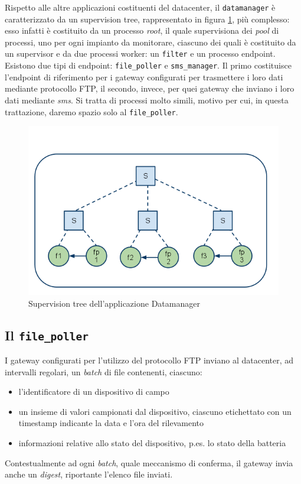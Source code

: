 %
Rispetto alle altre applicazioni costituenti del datacenter, il \texttt{datamanager} \`e 
caratterizzato da un supervision tree, rappresentato in figura \ref{datamanagersuptree},
pi\`u complesso: esso infatti \`e costituito da un processo \emph{root}, il quale supervisiona
dei \emph{pool} di processi, uno per ogni impianto da monitorare, ciascuno dei quali \`e costituito da un 
supervisor e da due processi worker: un \texttt{filter} e un processo endpoint.
%
Esistono due tipi di endpoint: \texttt{file\_poller} e \texttt{sms\_manager}. Il primo costituisce
l'endpoint di riferimento per i gateway configurati per trasmettere i loro dati mediante 
protocollo FTP, il secondo, invece, per quei gateway che inviano i loro dati mediante \emph{sms}.
%
Si tratta di processi molto simili, motivo per cui, in questa trattazione, daremo spazio solo al
\texttt{file\_poller}.
%

%
\begin{figure}[!h]
\centering
\includegraphics[width=380pt]{img/datamanager.png}
\caption{Supervision tree dell'applicazione Datamanager}
\label{datamanagersuptree}
\end{figure}
%

%
\subsection{Il \texttt{file\_poller}}
I gateway configurati per l'utilizzo del protocollo FTP inviano al datacenter, 
ad intervalli regolari, un \emph{batch} di file contenenti, ciascuno:
%
\begin{itemize}
\item l'identificatore di un dispositivo di campo
\item un insieme di valori campionati dal dispositivo, ciascuno etichettato con un 
      timestamp indicante la data e l'ora del rilevamento
\item informazioni relative allo stato del dispositivo, 
      p.es. lo stato della batteria
\end{itemize}
%
Contestualmente ad ogni \emph{batch}, quale meccanismo di conferma, il gateway invia anche un 
\emph{digest}, riportante l'elenco file inviati.
%

